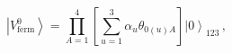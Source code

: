 \begin{equation}
\left|V^0_{\mbox{ferm}}\right>=\prod_{A=1}^4\left[\sum_{u=1}^3\alpha_u\theta_{0(u)A}\right]
\left|0\right>_{123}\,,
\end{equation}


